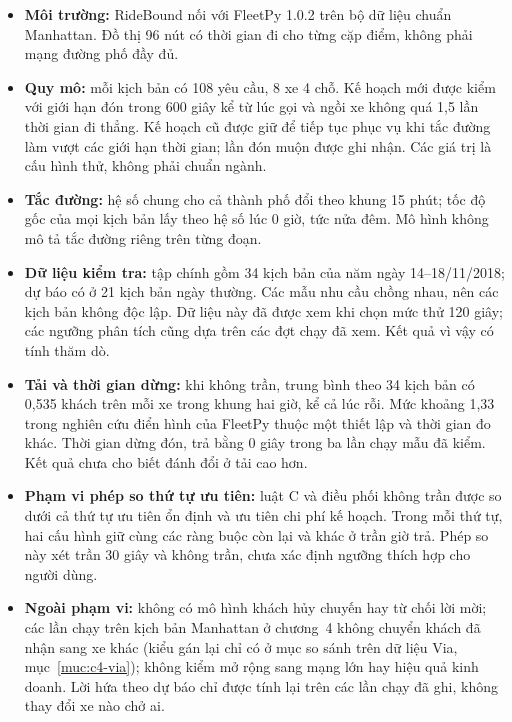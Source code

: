 \begin{itemize}[leftmargin=0.7cm,itemsep=3pt,topsep=3pt]
\item \textbf{Môi trường:} RideBound nối với FleetPy 1.0.2 trên bộ dữ liệu chuẩn Manhattan.
Đồ thị 96 nút có thời gian đi cho từng cặp điểm, không phải mạng đường phố đầy đủ.
\item \textbf{Quy mô:} mỗi kịch bản có 108 yêu cầu, 8 xe 4 chỗ. Kế hoạch mới được kiểm với giới hạn
đón trong 600 giây kể từ lúc gọi và ngồi xe không quá 1,5 lần thời gian đi thẳng. Kế hoạch cũ được
giữ để tiếp tục phục vụ khi tắc đường làm vượt các giới hạn thời gian; lần đón muộn được ghi nhận.
Các giá trị là cấu hình thử, không phải chuẩn ngành.
\item \textbf{Tắc đường:} hệ số chung cho cả thành phố đổi theo khung 15 phút; tốc độ gốc của mọi
kịch bản lấy theo hệ số lúc 0 giờ, tức nửa đêm. Mô hình không mô tả tắc đường riêng trên từng đoạn.
\item \textbf{Dữ liệu kiểm tra:} tập chính gồm 34 kịch bản của năm ngày 14--18/11/2018; dự báo có ở
21 kịch bản ngày thường. Các mẫu nhu cầu chồng nhau, nên các kịch bản không độc lập. Dữ liệu này đã
được xem khi chọn mức thử 120 giây; các ngưỡng phân tích cũng dựa trên các đợt chạy đã xem. Kết quả
vì vậy có tính thăm dò.
\item \textbf{Tải và thời gian dừng:} khi không trần, trung bình theo 34 kịch bản có 0,535 khách
trên mỗi xe trong khung hai giờ, kể cả lúc rỗi. Mức khoảng 1,33 trong nghiên cứu điển hình của
FleetPy thuộc một thiết lập và thời gian đo khác. Thời gian dừng đón, trả bằng 0 giây trong ba
lần chạy mẫu đã kiểm. Kết quả chưa cho biết đánh đổi ở tải cao hơn.
\item \textbf{Phạm vi phép so thứ tự ưu tiên:} luật C và điều phối không trần được so dưới cả thứ tự ưu tiên
ổn định và ưu tiên chi phí kế hoạch. Trong mỗi thứ tự, hai cấu hình giữ cùng các ràng buộc còn lại và khác ở
trần giờ trả. Phép so này xét trần 30 giây và không trần, chưa xác định ngưỡng thích hợp cho người dùng.
\item \textbf{Ngoài phạm vi:} không có mô hình khách hủy chuyến hay từ chối lời mời; các lần chạy trên kịch bản
Manhattan ở chương~4 không chuyển khách đã nhận sang xe khác (kiểu gán lại chỉ có ở mục so sánh trên dữ liệu Via,
mục~\ref{muc:c4-via}); không kiểm mở rộng sang mạng lớn hay hiệu quả kinh doanh.
Lời hứa theo dự báo chỉ được tính lại trên các lần chạy đã ghi, không thay đổi xe nào chở ai.
\end{itemize}

